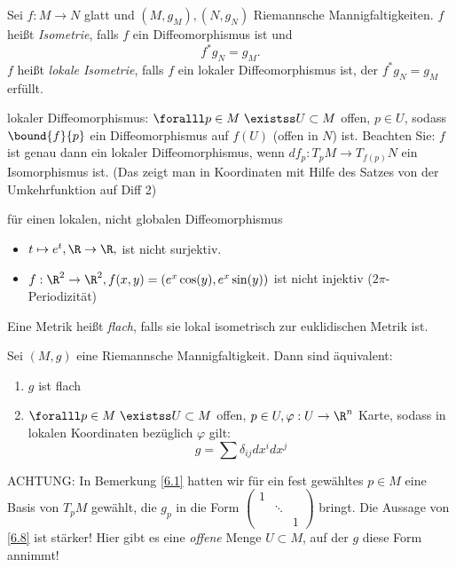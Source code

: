 \begin{defn*}
	Sei $ f:M \to N $ glatt und $ (M,g_M),(N,g_N) $ Riemannsche Mannigfaltigkeiten. $f$ heißt \emph{Isometrie}, falls $f$ ein Diffeomorphismus ist und 
	$$f^*g_N = g_M.$$
	$f$ heißt \emph{lokale Isometrie}, falls $f$ ein lokaler Diffeomorphismus ist, der $ f^*g_N = g_M $ erfüllt.
\end{defn*}

\begin{rem}
	lokaler Diffeomorphismus: $ \foralll p \in M \ \existss U \subset M $ offen, $p \in U$, sodass $ \bound{f}{p} $ ein Diffeomorphismus auf $f(U)$ (offen in $N$) ist. Beachten Sie: $f$ ist genau dann ein lokaler Diffeomorphismus, wenn $ df_p: T_pM \to T_{f(p)}N $ ein Isomorphismus ist. (Das zeigt man in Koordinaten mit Hilfe des Satzes von der Umkehrfunktion auf Diff 2)
\end{rem}

\begin{exmp*}
	für einen lokalen, nicht globalen Diffeomorphismus
	\begin{itemize}
		\item $t \mapsto e^t, \R \to \R,$ ist nicht surjektiv.
		\item $ f: \R^2 \to \R^2, f(x,y) = (e^x\cos(y),e^x\sin(y)) $ ist nicht injektiv ($2\pi$-Periodizität)
	\end{itemize}
\end{exmp*}

\begin{defn*}
	Eine Metrik heißt \emph{flach}, falls sie lokal isometrisch zur euklidischen Metrik ist.
\end{defn*}

\begin{thm}\label{6.8}
	Sei $ (M,g) $ eine Riemannsche Mannigfaltigkeit. Dann sind äquivalent:
	\begin{enumerate}[label={\roman*})]
		\item $g$ ist flach
		\item $ \foralll p \in M \ \existss U \subset M $ offen, $p \in U, \varphi: U \to \R^n$ Karte, sodass in lokalen Koordinaten bezüglich $\varphi$ gilt:
			\[ g = \sum \delta_{ij} dx^i dx^j \]
	\end{enumerate}
\end{thm}

\begin{rem*}
	ACHTUNG: In Bemerkung \ref{6.1} hatten wir für ein fest gewähltes $p \in M$ eine Basis von $ T_pM $ gewählt, die $g_p$ in die Form $ \begin{pmatrix}
		1&&\\&\ddots&\\&&1
	\end{pmatrix} $ bringt. Die Aussage von \ref{6.8} ist stärker! Hier gibt es eine \emph{offene} Menge $ U \subset M $, auf der $g$ diese Form annimmt!
\end{rem*}

